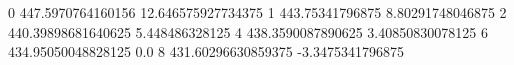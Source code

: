 0 447.5970764160156 12.646575927734375
1 443.75341796875 8.80291748046875
2 440.39898681640625 5.448486328125
4 438.3590087890625 3.40850830078125
6 434.95050048828125 0.0
8 431.60296630859375 -3.3475341796875
